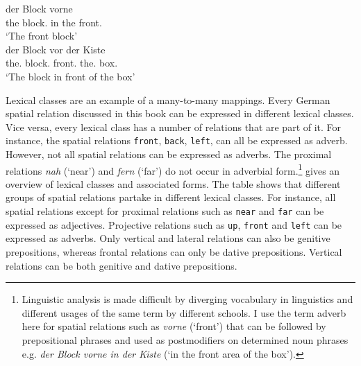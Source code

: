 \z
\ea
\label{e:der-block-vorne-2}
\gll der Block vorne\\
the block.{\NOM} in the front.{\ADV} \\
\glt `The front block'\\

\z
\ea
\label{e:der-block-vor-der-kiste-2}
\gll der Block vor der Kiste \\
the.{\NOM} block.{\NOM} front.{\PREP} the.{\DAT} box.{\DAT} \\
\glt `The block in front of the box'\\

\z

Lexical classes are an example of a many-to-many mappings. 
Every German spatial relation discussed in this book
can be expressed in different lexical classes.
Vice versa, every lexical class has a number of relations that 
are part of it. For instance, the spatial relations {\footnotesize\tt front}, {\footnotesize\tt back}, 
{\footnotesize\tt left}, can all be expressed as adverb. 
However, not all spatial relations can
be expressed as adverbs. The proximal relations \textit{nah} (`near') and \textit{fern} (`far') 
do not occur in adverbial form.\footnote{Linguistic analysis is made 
difficult by diverging vocabulary in linguistics and different usages of 
the same term by different schools. I use the term adverb here for spatial relations
such as \textit{vorne} (`front') that can be followed by prepositional phrases and
used as postmodifiers on determined noun phrases e.g. 
\textit{der Block vorne in der Kiste} (`in the front area of the box').}
 gives an overview of lexical
classes and associated forms. The table shows that different
groups of spatial relations partake in different lexical classes. 
For instance, all spatial relations except for proximal relations 
such as {\footnotesize\tt near} and {\footnotesize\tt far} can be expressed as
adjectives. Projective relations such as {\footnotesize\tt up}, {\footnotesize\tt front}
and {\footnotesize\tt left} can be expressed as adverbs. Only
vertical and lateral relations can also be genitive prepositions, whereas
frontal relations can only be dative prepositions. Vertical relations can be both 
genitive and dative prepositions. 

